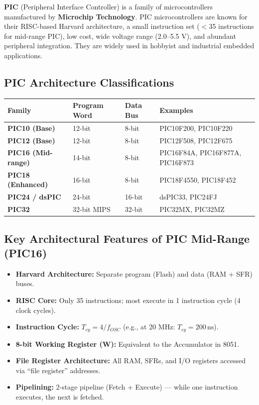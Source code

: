 \documentclass[12pt,a4paper]{article}
\renewcommand{\arraystretch}{1.45}
\begin{document}
\begin{tcolorbox}[defbox, title={\textbf{PIC Microcontroller}}]
\textbf{PIC} (Peripheral Interface Controller) is a family of microcontrollers manufactured by \textbf{Microchip Technology}. PIC microcontrollers are known for their RISC-based Harvard architecture, a small instruction set ($<$35 instructions for mid-range PIC), low cost, wide voltage range (2.0--5.5 V), and abundant peripheral integration. They are widely used in hobbyist and industrial embedded applications.
\end{tcolorbox}

\subsection{PIC Architecture Classifications}

\par\noindent
{\renewcommand{\arraystretch}{1.6}%
\begin{tabularx}{\linewidth}{|B{3.0cm}|Y|Y|Y|}
\hline
\textbf{Family} & \textbf{Program Word} & \textbf{Data Bus} & \textbf{Examples} \\
\hline
\textbf{PIC10 (Base)} & 12-bit & 8-bit & PIC10F200, PIC10F220 \\
\hline
\textbf{PIC12 (Base)} & 12-bit & 8-bit & PIC12F508, PIC12F675 \\
\hline
\textbf{PIC16 (Mid-range)} & 14-bit & 8-bit & PIC16F84A, PIC16F877A, PIC16F873 \\
\hline
\textbf{PIC18 (Enhanced)} & 16-bit & 8-bit & PIC18F4550, PIC18F452 \\
\hline
\textbf{PIC24 / dsPIC} & 24-bit & 16-bit & dsPIC33, PIC24FJ \\
\hline
\textbf{PIC32} & 32-bit MIPS & 32-bit & PIC32MX, PIC32MZ \\
\hline
\end{tabularx}}

\subsection{Key Architectural Features of PIC Mid-Range (PIC16)}
\begin{itemize}[leftmargin=*, itemsep=3pt]
  \item \textbf{Harvard Architecture:} Separate program (Flash) and data (RAM + SFR) buses.
  \item \textbf{RISC Core:} Only 35 instructions; most execute in 1 instruction cycle (4 clock cycles).
  \item \textbf{Instruction Cycle:} $T_{cy} = 4 / f_{OSC}$ (e.g., at 20 MHz: $T_{cy} = 200\,\text{ns}$).
  \item \textbf{8-bit Working Register (W):} Equivalent to the Accumulator in 8051.
  \item \textbf{File Register Architecture:} All RAM, SFRs, and I/O registers accessed via ``file register'' addresses.
  \item \textbf{Pipelining:} 2-stage pipeline (Fetch + Execute) --- while one instruction executes, the next is fetched.
\end{itemize}
\end{document}
